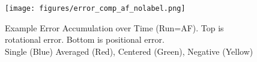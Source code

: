 \documentclass[conference]{IEEEtran}
\begin{document}
\begin{figure}
    \centering
    \texttt{[image: figures/error\_comp\_af\_nolabel.png]}
    \caption{Example Error Accumulation over Time (Run=AF). Top is rotational error. Bottom is positional error. \\
    Single (Blue) Averaged (Red), Centered (Green), Negative (Yellow) }
    \label{fig:error_af}
\end{figure}




\end{document}
